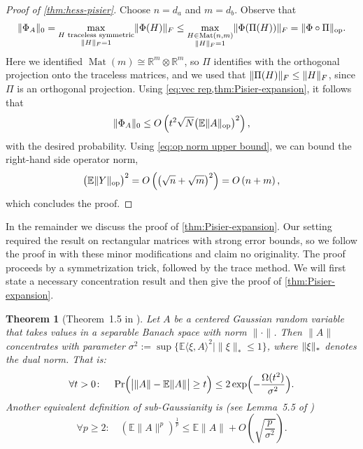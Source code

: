 \documentclass[aos]{imsart}
\newtheorem{theorem}{Theorem}[section]
\theoremstyle{definition}
\numberwithin{equation}{section}
\DeclareMathOperator{\op}{op}
\DeclareMathOperator{\Mat}{Mat}
\DeclarePairedDelimiter{\abs}{\lvert}{\rvert}
\DeclarePairedDelimiter{\norm}{\lVert}{\rVert}
\newcommand{\R}{{\mathbb{R}}}
\newcommand{\ot}{\otimes}
\newcommand{\E}{\mathbb{E}}
\begin{document}
\begin{appendix}
\begin{proof}[Proof of \cref{thm:hess-pisier}]
Choose $n=d_a$ and $m=d_b$.
Observe that
\begin{align*}
  \norm{\Phi_A}_0
= \max_{\substack{H \text{ traceless symmetric} \\ \norm H_F=1}} \norm{\Phi(H)}_F
\leq %
\max_{\substack{H \in \Mat(n,m) \\ \norm H_F = 1}} \norm{\Phi(\Pi(H))}_F
= \norm{\Phi \circ \Pi}_{\op}.
\end{align*}
Here we identified $\Mat(m) \cong \R^m \ot \R^m$, so $\Pi$ identifies with the orthogonal projection onto the traceless matrices, and we used that $\norm{\Pi(H)}_F \leq \norm{H}_F$, since $\Pi$ is an orthogonal projection.
Using \cref{eq:vec rep,thm:Pisier-expansion}, it follows that
\begin{align*}
  \norm{\Phi_A}_0 \leq O\left( t^2 \sqrt{N} \bigl( \E \norm{A}_{\op} \bigr)^2 \right),
\end{align*}
with the desired probability.
Using \cref{eq:op norm upper bound}, we can bound the right-hand side operator norm,
\begin{align*}
  \bigl( \E \norm{Y}_{\op} \bigr)^2
= O\left( \left( \sqrt{n} + \sqrt{m} \right)^2 \right)
= O\left(n+m\right),
\end{align*}
which concludes the proof.
\end{proof}

In the remainder we discuss the proof of \cref{thm:Pisier-expansion}.
Our setting required the result on rectangular matrices with strong error bounds, so we follow the proof in \cite{pisier2012grothendieck} with these minor modifications and claim no originality.
The proof proceeds by a symmetrization trick, followed by the trace method.
We will first state a necessary concentration result and then give the proof of \cref{thm:Pisier-expansion}.

\begin{theorem}[Theorem~1.5 in \cite{P86}]\label{thm:banach conc}
Let $A$ be a centered Gaussian random variable that takes values in a separable Banach space with norm $\|\cdot\|$.
Then $\|A\|$ concentrates with parameter $\sigma^2 := \sup \{ \E \langle \xi, A \rangle^{2} \mid \|\xi\|_{*} \leq 1 \}$, where $\norm{\xi}_*$ denotes the dual norm.
That is:
\[ \forall t > 0 \colon \quad \Pr\Bigl( \abs[\big]{\norm A - \E \norm A} \geq t\Bigr) \leq 2 \exp\Bigl( - \frac{\Omega(t^2)}{\sigma^{2}}\Bigr).   \]
Another equivalent definition of sub-Gaussianity is (see Lemma~5.5 of \cite{vershynin2010introduction})
\begin{equation}\label{eq:conc via moments}
  \forall p \geq 2 \colon \quad (\E \|A\|^{p})^{\frac{1}{p}} \leq \E \|A\| + O \left( \sqrt{\frac{p}{\sigma^{2}}} \right).
\end{equation}
\end{theorem}


\end{appendix}
\end{document}

